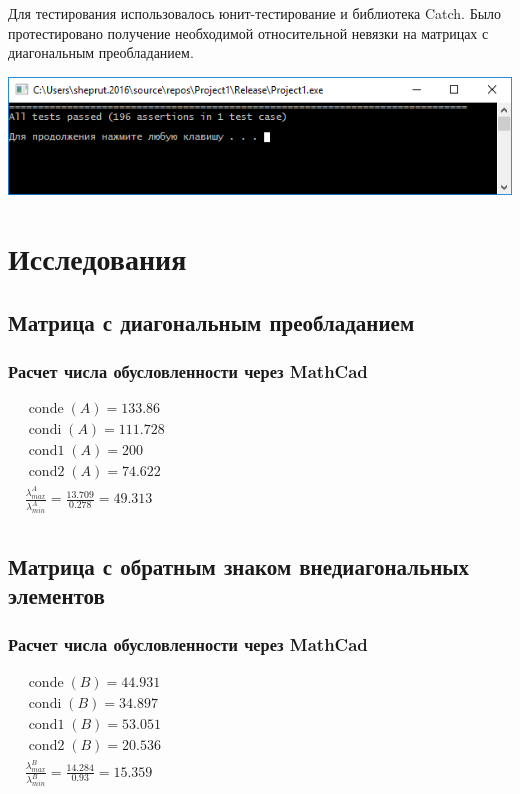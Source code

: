Для тестирования использовалось юнит-тестирование и библиотека Catch. Было протестировано получение необходимой относительной невязки на матрицах с диагональным преобладанием.

\begin{center}
\noindent\includegraphics[scale=0.7]{unit_test.png}
\end{center}

\section{Исследования}

\subsection{Матрица с диагональным преобладанием}


\subsubsection{Расчет числа обусловленности через MathCad}
$\displaystyle
	\begin{aligned}
		&\mathop{conde}(A) = 133.86 \\
		&\mathop{condi}(A) = 111.728 \\
		&\mathop{cond1}(A) = 200  \\
		&\mathop{cond2}(A) = 74.622  \\
		&\frac{\lambda^A_{max}}{\lambda^A_{min}} = \frac{13.709}{0.278} = 49.313  \\
	\end{aligned}
$

\subsection{Матрица с обратным знаком внедиагональных элементов}


\subsubsection{Расчет числа обусловленности через MathCad}
$\displaystyle
	\begin{aligned}
		&\mathop{conde}(B) = 44.931 \\
		&\mathop{condi}(B) = 34.897 \\
		&\mathop{cond1}(B) = 53.051  \\
		&\mathop{cond2}(B) = 20.536  \\
		&\frac{\lambda^B_{max}}{\lambda^B_{min}} = \frac{14.284}{0.93} = 15.359  \\
	\end{aligned}
$

